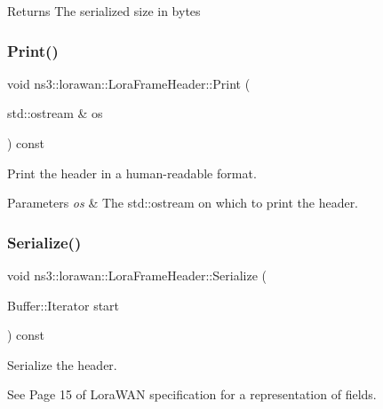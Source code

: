 \begin{DoxyReturn}{Returns}
The serialized size in bytes 
\end{DoxyReturn}
\mbox{\label{classns3_1_1lorawan_1_1LoraFrameHeader_a2578ff0866c0af15bb5239ccbb0c7964}} 
\subsubsection{\texorpdfstring{Print()}{Print()}}
{\footnotesize\ttfamily void ns3\+::lorawan\+::\+Lora\+Frame\+Header\+::\+Print (\begin{DoxyParamCaption}\item[{std\+::ostream \&}]{os }\end{DoxyParamCaption}) const\hspace{0.3cm}{\ttfamily [virtual]}}

Print the header in a human-\/readable format.


\begin{DoxyParams}{Parameters}
{\em os} & The std\+::ostream on which to print the header. \\
\hline
\end{DoxyParams}
\mbox{\label{classns3_1_1lorawan_1_1LoraFrameHeader_a736fa7bd7de7cea2179784433f6c5adb}} 
\subsubsection{\texorpdfstring{Serialize()}{Serialize()}}
{\footnotesize\ttfamily void ns3\+::lorawan\+::\+Lora\+Frame\+Header\+::\+Serialize (\begin{DoxyParamCaption}\item[{Buffer\+::\+Iterator}]{start }\end{DoxyParamCaption}) const\hspace{0.3cm}{\ttfamily [virtual]}}

Serialize the header.

See Page 15 of Lora\+W\+AN specification for a representation of fields.


